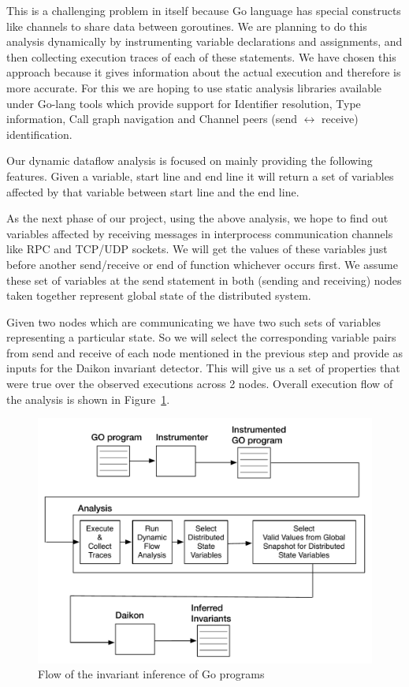 This is a challenging problem in itself because Go language has
special constructs like channels to share data between goroutines. We
are planning to do this analysis dynamically by instrumenting variable
declarations and assignments, and then collecting execution traces of
each of these statements. We have chosen this approach because it
gives information about the actual execution and therefore is more
accurate. For this we are hoping to use static analysis libraries
available under Go-lang tools\cite{static_golang} which provide
support for Identifier resolution, Type information, Call graph
navigation and Channel peers (send $\leftrightarrow$ receive)
identification.

Our dynamic dataflow analysis is focused on mainly providing the
following features. Given a variable, start line and end line it will
return a set of variables affected by that variable between start line
and the end line.

As the next phase of our project, using the above analysis, we hope to
find out variables affected by receiving messages in interprocess
communication channels like RPC and TCP/UDP sockets. We will get the
values of these variables just before another send/receive or end of
function whichever occurs first. We assume these set of variables at
the send statement in both (sending and receiving) nodes taken
together represent global state of the distributed system.

Given two nodes which are communicating we have two such sets of
variables representing a particular state. So we will select the
corresponding variable pairs from send and receive of each node
mentioned in the previous step and provide as inputs for the Daikon
invariant detector. This will give us a set of properties that were
true over the observed executions across 2 nodes. Overall execution
flow of the analysis is shown in Figure~\ref{fig:go_flow}.


\begin{figure}
  \includegraphics[width=\columnwidth]{go_flow.pdf}
  \caption{Flow of the invariant inference of Go programs}
  \label{fig:go_flow}
\end{figure}
